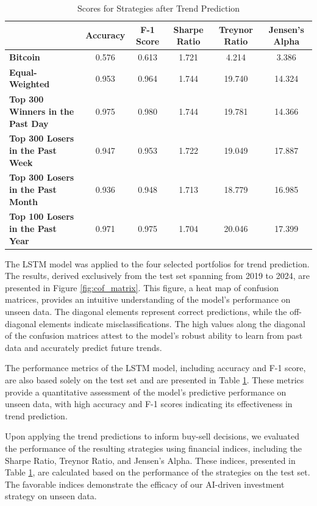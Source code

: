 \documentclass[journal]{IEEEtran}
\begin{document}
\begin{table}[h!]
\centering
\begin{tabular}{|l|c|c|c|c|c|}
\hline
 & \textbf{Accuracy} & \textbf{F-1 Score} & \textbf{Sharpe Ratio} & \textbf{Treynor Ratio} & \textbf{Jensen's Alpha} \\
\hline
\textbf{Bitcoin} & 0.576 & 0.613 & 1.721 & 4.214 & 3.386 \\
\hline
\textbf{Equal-Weighted} & 0.953 & 0.964 & 1.744 & 19.740 & 14.324 \\
\hline
\textbf{Top 300 Winners in the Past Day} & 0.975 & 0.980 & 1.744 & 19.781 & 14.366 \\
\hline
\textbf{Top 300 Losers in the Past Week} & 0.947 & 0.953 & 1.722 & 19.049 & 17.887 \\
\hline
\textbf{Top 300 Losers in the Past Month} & 0.936 & 0.948 & 1.713 & 18.779 & 16.985 \\
\hline
\textbf{Top 100 Losers in the Past Year} & 0.971 & 0.975 & 1.704 & 20.046 & 17.399 \\
\hline
\end{tabular}
\vspace{10pt}
\caption{Scores for Strategies after Trend Prediction}
\label{tab:scores}
\end{table}


The LSTM model was applied to the four selected portfolios for trend prediction. The results, derived exclusively from the test set spanning from 2019 to 2024, are presented in Figure \ref{fig:cof_matrix}. This figure, a heat map of confusion matrices, provides an intuitive understanding of the model's performance on unseen data. The diagonal elements represent correct predictions, while the off-diagonal elements indicate misclassifications. The high values along the diagonal of the confusion matrices attest to the model's robust ability to learn from past data and accurately predict future trends.

The performance metrics of the LSTM model, including accuracy and F-1 score, are also based solely on the test set and are presented in Table \ref{tab:scores}. These metrics provide a quantitative assessment of the model's predictive performance on unseen data, with high accuracy and F-1 scores indicating its effectiveness in trend prediction.

Upon applying the trend predictions to inform buy-sell decisions, we evaluated the performance of the resulting strategies using financial indices, including the Sharpe Ratio, Treynor Ratio, and Jensen's Alpha. These indices, presented in Table \ref{tab:scores}, are calculated based on the performance of the strategies on the test set. The favorable indices demonstrate the efficacy of our AI-driven investment strategy on unseen data.
\end{document}
